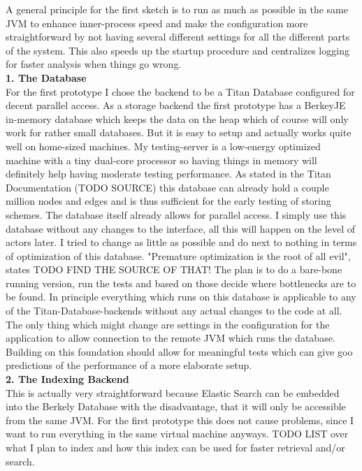 \documentclass[11p]{scrartcl}
\begin{document}
A general principle for the first sketch is to run as much as possible in the same JVM to enhance inner-process speed and make the configuration more straightforward by not having several different settings for all the different parts of the system. This also speeds up the startup procedure and centralizes logging for faster analysis when things go wrong. \\

\textbf{1. The Database}\\
For the first prototype I chose the backend to be a Titan Database configured for decent parallel access. As a storage backend the first prototype has a BerkeyJE in-memory database which keeps the data on the heap which of course will only work for rather small databases. But it is easy to setup and actually works quite well on home-sized machines. My testing-server is a low-energy optimized machine with a tiny dual-core processor so having things in memory will definitely help having moderate testing performance. As stated in the Titan Documentation (TODO SOURCE) this database can already hold a couple million nodes and edges and is thus sufficient for the early testing of storing schemes. 
The database itself already allows for parallel access. I simply use this database without any changes to the interface, all this will happen on the level of actors later. I tried to change as little as possible and do next to nothing in terms of optimization of this database. "Premature optimization is the root of all evil", states TODO FIND THE SOURCE OF THAT! The plan is to do a bare-bone running version, run the tests and based on those decide where bottlenecks are to be found.
In principle everything which runs on this database is applicable to any of the Titan-Database-backends without any actual changes to the code at all. The only thing which might change are settings in the configuration for the application to allow connection to the remote JVM which runs the database.
Building on this foundation should allow for meaningful tests which can give goo predictions of the performance of a more elaborate setup.\\

\textbf{2. The Indexing Backend}\\
This is actually very straightforward because Elastic Search can be embedded into the Berkely Database with the disadvantage, that it will only be accessible from the same JVM. For the first prototype this does not cause problems, since I want to run everything in the same virtual machine anyways. TODO LIST over what I plan to index and how this index can be used for faster retrieval and/or search.\\
\end{document}
